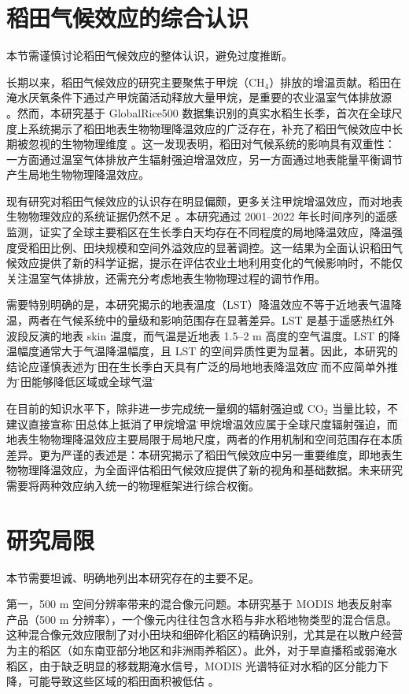 \section{稻田气候效应的综合认识}

本节需谨慎讨论稻田气候效应的整体认识，避免过度推断。

长期以来，稻田气候效应的研究主要聚焦于甲烷（CH$_4$）排放的增温贡献。稻田在淹水厌氧条件下通过产甲烷菌活动释放大量甲烷，是重要的农业温室气体排放源 \cite{Zhang2020NatCommun}。然而，本研究基于 GlobalRice500 数据集识别的真实水稻生长季，首次在全球尺度上系统揭示了稻田地表生物物理降温效应的广泛存在，补充了稻田气候效应中长期被忽视的生物物理维度 \cite{Weng2025}。这一发现表明，稻田对气候系统的影响具有双重性：一方面通过温室气体排放产生辐射强迫增温效应，另一方面通过地表能量平衡调节产生局地生物物理降温效应。

现有研究对稻田气候效应的认识存在明显偏颇，更多关注甲烷增温效应，而对地表生物物理效应的系统证据仍然不足 \cite{Weng2025}。本研究通过 2001--2022 年长时间序列的遥感监测，证实了全球主要稻区在生长季白天均存在不同程度的局地降温效应，降温强度受稻田比例、田块规模和空间外溢效应的显著调控。这一结果为全面认识稻田气候效应提供了新的科学证据，提示在评估农业土地利用变化的气候影响时，不能仅关注温室气体排放，还需充分考虑地表生物物理过程的调节作用。

需要特别明确的是，本研究揭示的地表温度（LST）降温效应不等于近地表气温降温，两者在气候系统中的量级和影响范围存在显著差异。LST 是基于遥感热红外波段反演的地表 skin 温度，而气温是近地表 1.5--2 m 高度的空气温度。LST 的降温幅度通常大于气温降温幅度，且 LST 的空间异质性更为显著。因此，本研究的结论应谨慎表述为\"稻田在生长季白天具有广泛的局地地表降温效应\"，而不应简单外推为\"稻田能够降低区域或全球气温\"。

在目前的知识水平下，除非进一步完成统一量纲的辐射强迫或 CO$_2$ 当量比较，不建议直接宣称\"稻田总体上抵消了甲烷增温\"。甲烷增温效应属于全球尺度辐射强迫，而地表生物物理降温效应主要局限于局地尺度，两者的作用机制和空间范围存在本质差异。更为严谨的表述是：本研究揭示了稻田气候效应中另一重要维度，即地表生物物理降温效应，为全面评估稻田气候效应提供了新的视角和基础数据。未来研究需要将两种效应纳入统一的物理框架进行综合权衡。

\section{研究局限}

本节需要坦诚、明确地列出本研究存在的主要不足。

第一，500 m 空间分辨率带来的混合像元问题。本研究基于 MODIS 地表反射率产品（500 m 分辨率），一个像元内往往包含水稻与非水稻地物类型的混合信息。这种混合像元效应限制了对小田块和细碎化稻区的精确识别，尤其是在以散户经营为主的稻区（如东南亚部分地区和非洲雨养稻区）。此外，对于旱直播稻或弱淹水稻区，由于缺乏明显的移栽期淹水信号，MODIS 光谱特征对水稻的区分能力下降，可能导致这些区域的稻田面积被低估 \cite{Han2021}。

